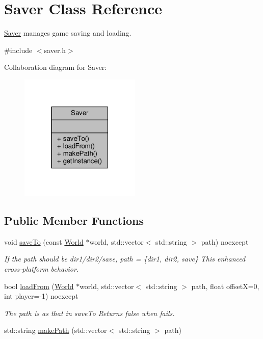 \hypertarget{classSaver}{}\section{Saver Class Reference}
\label{classSaver}


\hyperlink{classSaver}{Saver} manages game saving and loading.  




{\ttfamily \#include $<$saver.\+h$>$}



Collaboration diagram for Saver\+:\nopagebreak
\begin{figure}[H]
\begin{center}
\leavevmode
\includegraphics[width=163pt]{classSaver__coll__graph}
\end{center}
\end{figure}
\subsection*{Public Member Functions}
\begin{DoxyCompactItemize}
\item 
void \hyperlink{classSaver_a999e36bd249d1ed0bf4748991a72d2f9}{save\+To} (const \hyperlink{classWorld}{World} $\ast$world, std\+::vector$<$ std\+::string $>$ path) noexcept
\begin{DoxyCompactList}\small\item\em If the path should be dir1/dir2/save, path = \{dir1, dir2, save\} This enhanced cross-\/platform behavior. \end{DoxyCompactList}\item 
bool \hyperlink{classSaver_a349f98e86636f4ba13a8912b8d56a235}{load\+From} (\hyperlink{classWorld}{World} $\ast$world, std\+::vector$<$ std\+::string $>$ path, float offset\+X=0, int player=-\/1) noexcept
\begin{DoxyCompactList}\small\item\em The path is as that in save\+To Returns false when fails. \end{DoxyCompactList}\item 
std\+::string \hyperlink{classSaver_a9483a0cd5284f84cb3b138aa44b6969e}{make\+Path} (std\+::vector$<$ std\+::string $>$ path)
\end{DoxyCompactItemize}
